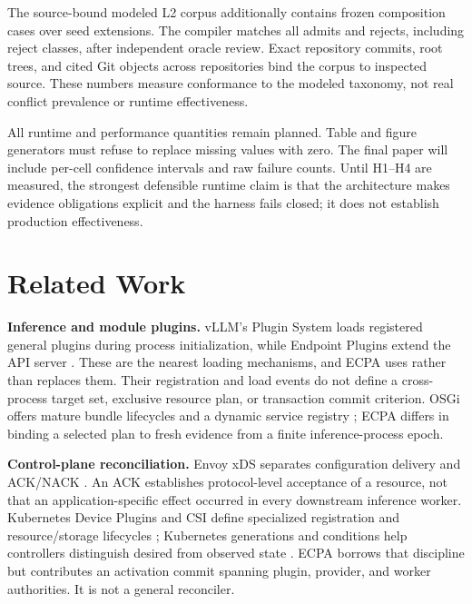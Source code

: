 \documentclass[letterpaper,twocolumn,10pt]{article}
\begin{document}
The source-bound modeled L2 corpus additionally contains \ECPAPlannerCases{}
frozen composition cases over \ECPAPlannerSeedExtensions{} seed extensions.
The compiler matches all \ECPAPlannerAdmits{} admits and \ECPAPlannerRejects{}
rejects, including reject classes, after independent oracle review.  Exact
repository commits, root trees, and \ECPASourceObjects{} cited Git objects
across \ECPASourceRepositories{} repositories
bind the corpus to inspected source.  These numbers measure conformance to the
modeled taxonomy, not real conflict prevalence or runtime effectiveness.

All runtime and performance quantities remain planned.  Table and figure
generators must refuse to replace missing values with zero.  The final paper
will include per-cell confidence intervals and raw failure counts.  Until
H1--H4 are measured, the strongest defensible runtime claim is that the
architecture makes evidence obligations explicit and the harness fails closed;
it does not establish production effectiveness.

\section{Related Work}
\textbf{Inference and module plugins.}  vLLM's Plugin System loads registered
general plugins during process initialization, while Endpoint Plugins extend
the API server \cite{vllm-plugin,vllm-endpoint}.  These are the nearest loading
mechanisms, and ECPA uses rather than replaces them.  Their registration and
load events do not define a cross-process target set, exclusive resource plan,
or transaction commit criterion.  OSGi offers mature bundle lifecycles and a
dynamic service registry \cite{osgi-core}; ECPA differs in binding a selected
plan to fresh evidence from a finite inference-process epoch.

\textbf{Control-plane reconciliation.}  Envoy xDS separates configuration
delivery and ACK/NACK \cite{envoy-xds}.  An ACK establishes protocol-level
acceptance of a resource, not that an application-specific effect occurred in
every downstream inference worker.  Kubernetes Device Plugins and CSI define
specialized registration and resource/storage lifecycles
\cite{k8s-device-plugin,csi-spec}; Kubernetes generations and conditions help
controllers distinguish desired from observed state \cite{k8s-api-conventions}.
ECPA borrows that discipline but contributes an activation commit spanning
plugin, provider, and worker authorities.  It is not a general reconciler.
\end{document}
